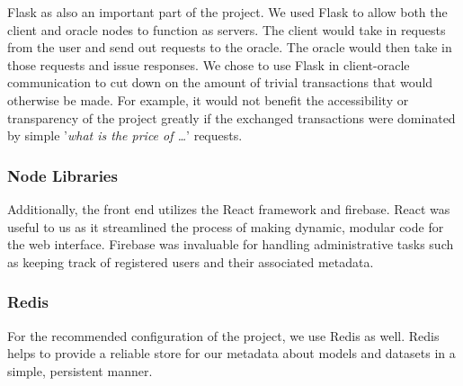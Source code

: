 \documentclass{ledger}
\begin{document}
Flask as also an important part of the project.  We used Flask to allow both
the client and oracle nodes to function as servers.  The client would take in requests from the user and send out
requests to the oracle.  The oracle would then take in those requests and issue responses.  We chose to use Flask in
client-oracle communication to cut down on the amount of trivial transactions that would otherwise be made.  For example,
it would not benefit the accessibility or transparency of the project greatly if the exchanged transactions were
dominated by simple '\textit{what is the price of \ldots}' requests.

\subsubsection*{Node Libraries}

Additionally, the front end utilizes the React framework and firebase.  React was useful to us as it streamlined the process of making
dynamic, modular code for the web interface.  Firebase was invaluable for handling administrative tasks such as keeping
track of registered users and their associated metadata.

\subsubsection*{Redis}

For the recommended configuration of the project, we use Redis as well.  Redis helps to provide a reliable store for
our metadata about models and datasets in a simple, persistent manner.



\end{document}
